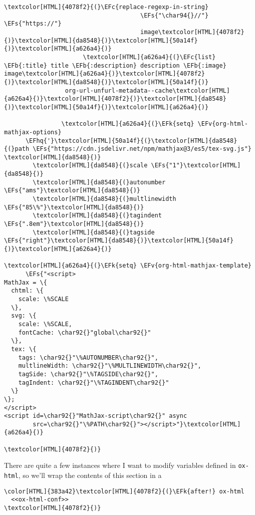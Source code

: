 \documentclass{scrartcl}
\newcommand{\EFk}[1]{\textcolor{EFk}{#1}} %
\newcommand{\EFs}[1]{\textcolor{EFs}{#1}} %
\newcommand{\EFb}[1]{\textcolor{EFb}{#1}} %
\newcommand{\EFc}[1]{\textcolor{EFc}{#1}} %
\newcommand{\EFv}[1]{\textcolor{EFv}{#1}} %
\newcommand{\EFhq}[1]{\textcolor{EFhq}{#1}} %
\begin{document}
\begin{Code}
\begin{Verbatim}[]
                                     \textcolor[HTML]{4078f2}{(}\EFc{replace-regexp-in-string}
                                      \EFs{"\char94{}//"} \EFs{"https://"}
                                      image\textcolor[HTML]{4078f2}{)}\textcolor[HTML]{da8548}{)}\textcolor[HTML]{50a14f}{)}\textcolor[HTML]{a626a4}{)}
                      \textcolor[HTML]{a626a4}{(}\EFc{list} \EFb{:title} title \EFb{:description} description \EFb{:image} image\textcolor[HTML]{a626a4}{)}\textcolor[HTML]{4078f2}{)}\textcolor[HTML]{da8548}{)}\textcolor[HTML]{50a14f}{)}
                 org-url-unfurl-metadata--cache\textcolor[HTML]{a626a4}{)}\textcolor[HTML]{4078f2}{)}\textcolor[HTML]{da8548}{)}\textcolor[HTML]{50a14f}{)}\textcolor[HTML]{a626a4}{)}

                \textcolor[HTML]{a626a4}{(}\EFk{setq} \EFv{org-html-mathjax-options}
      \EFhq{'}\textcolor[HTML]{50a14f}{(}\textcolor[HTML]{da8548}{(}path \EFs{"https://cdn.jsdelivr.net/npm/mathjax@3/es5/tex-svg.js"} \textcolor[HTML]{da8548}{)}
        \textcolor[HTML]{da8548}{(}scale \EFs{"1"}\textcolor[HTML]{da8548}{)}
        \textcolor[HTML]{da8548}{(}autonumber \EFs{"ams"}\textcolor[HTML]{da8548}{)}
        \textcolor[HTML]{da8548}{(}multlinewidth \EFs{"85\%"}\textcolor[HTML]{da8548}{)}
        \textcolor[HTML]{da8548}{(}tagindent \EFs{".8em"}\textcolor[HTML]{da8548}{)}
        \textcolor[HTML]{da8548}{(}tagside \EFs{"right"}\textcolor[HTML]{da8548}{)}\textcolor[HTML]{50a14f}{)}\textcolor[HTML]{a626a4}{)}

\textcolor[HTML]{a626a4}{(}\EFk{setq} \EFv{org-html-mathjax-template}
      \EFs{"<script>
MathJax = \{
  chtml: \{
    scale: \%SCALE
  \},
  svg: \{
    scale: \%SCALE,
    fontCache: \char92{}"global\char92{}"
  \},
  tex: \{
    tags: \char92{}"\%AUTONUMBER\char92{}",
    multlineWidth: \char92{}"\%MULTLINEWIDTH\char92{}",
    tagSide: \char92{}"\%TAGSIDE\char92{}",
    tagIndent: \char92{}"\%TAGINDENT\char92{}"
  \}
\};
</script>
<script id=\char92{}"MathJax-script\char92{}" async
        src=\char92{}"\%PATH\char92{}"></script>"}\textcolor[HTML]{a626a4}{)}

\textcolor[HTML]{4078f2}{)}
\end{Verbatim}
\end{Code}

There are quite a few instances where I want to modify variables defined in
\texttt{ox-html}, so we'll wrap the contents of this section in a
\begin{Code}
\begin{Verbatim}[]
\color[HTML]{383a42}\textcolor[HTML]{4078f2}{(}\EFk{after!} ox-html
  <<ox-html-conf>>
\textcolor[HTML]{4078f2}{)}
\end{Verbatim}
\end{Code}
\end{document}

